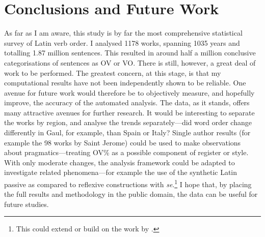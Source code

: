 \documentclass[11pt,a4paper]{scrartcl} %
\begin{document}
\section{Conclusions and Future Work}

As far as I am aware, this study is by far the most comprehensive statistical survey of Latin verb order. I analysed 1178 works, spanning 1035 years and totalling 1.87 million sentences. This resulted in around half a million conclusive categorisations of sentences as OV or VO. There is still, however, a great deal of work to be performed. The greatest concern, at this stage, is that my computational results have not been independently shown to be reliable. One avenue for future work would therefore be to objectively measure, and hopefully improve, the accuracy of the automated analysis. The data, as it stands, offers many attractive avenues for further research. It would be interesting to separate the works by region, and analyse the trends separately---did word order change differently in Gaul, for example, than Spain or Italy? Single author results (for example the 98 works by Saint Jerome) could be used to make observations about pragmatics---treating OV\% as a possible component of register or style. With only moderate changes, the analysis framework could be adapted to investigate related phenomena---for example the use of the synthetic Latin passive as compared to reflexive constructions with \textit{se}.\footnote{This could extend or build on the work by \cite{green}.} I hope that, by placing the full results and methodology in the public domain, the data can be useful for future studies.
\end{document}
